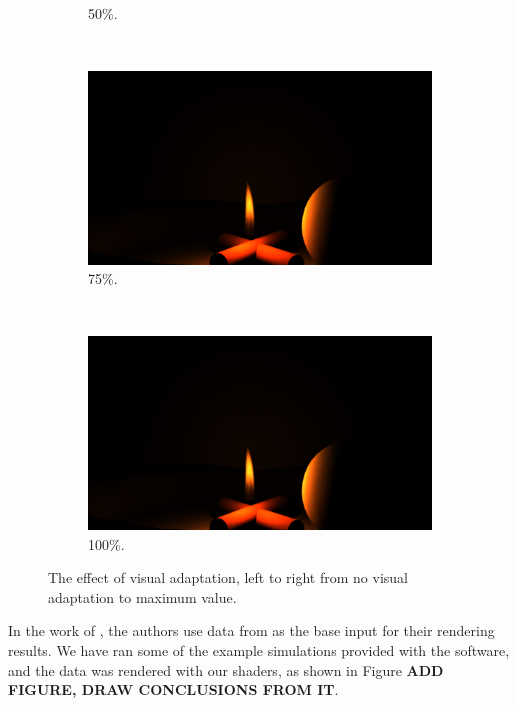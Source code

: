 \begin{figure}[htpb]
\begin{subfigure}[t]{0.2\textwidth}
                \caption{50\%.}
        \end{subfigure}%
        ~ 
        \begin{subfigure}[t]{0.2\textwidth}
                \includegraphics[width=\textwidth, trim={14.5cm 2.5cm 16.5cm 10.5cm}, clip]{img/result_propane_0_75_v}
                \caption{75\%.}
        \end{subfigure}%
        ~ 
        \begin{subfigure}[t]{0.2\textwidth}
                \includegraphics[width=\textwidth, trim={14.5cm 2.5cm 16.5cm 10.5cm}, clip]{img/result_propane_1_v}
                \caption{100\%.}
        \end{subfigure}%
        \caption{The effect of visual adaptation, left to right from no visual adaptation to maximum value.}
        \label{fig:visual_adaptation_states}
\end{figure}

In the work of \cite{Pegoraro:2006}, the authors use data from \cite{Uintah} as the base input for their rendering results.
We have ran some of the example simulations provided with the software, and the data was rendered with our shaders, as shown in Figure \textbf{ADD FIGURE, DRAW CONCLUSIONS FROM IT}.    

